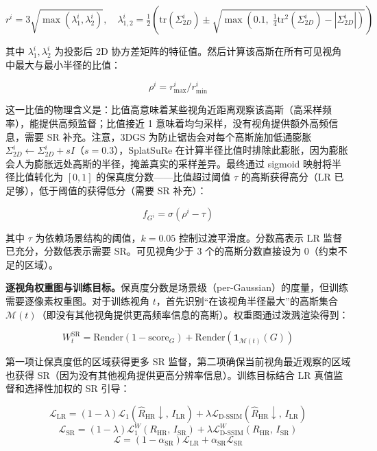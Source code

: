 \begin{equation}
r^i = 3\sqrt{\max(\lambda^i_1, \lambda^i_2)}, \quad \lambda^i_{1,2} = \tfrac{1}{2}\!\left(\text{tr}(\Sigma^i_{2D}) \pm \sqrt{\max\!\left(0.1,\;\tfrac{1}{4}\text{tr}^2(\Sigma^i_{2D}) - |\Sigma^i_{2D}|\right)}\right)
\end{equation}

其中 $\lambda^i_1, \lambda^i_2$ 为投影后 2D 协方差矩阵的特征值。然后计算该高斯在所有可见视角中最大与最小半径的比值：

\begin{equation}
\rho^i = r^i_{\max} / r^i_{\min}
\end{equation}

这一比值的物理含义是：比值高意味着某些视角近距离观察该高斯（高采样频率），能提供高频监督；比值接近 1 意味着均匀采样，没有视角提供额外高频信息，需要 SR 补充。注意，3DGS 为防止锯齿会对每个高斯施加低通膨胀 $\Sigma^i_{2D} \leftarrow \Sigma^i_{2D} + sI$（$s=0.3$），SplatSuRe 在计算半径比值时排除此膨胀，因为膨胀会人为膨胀远处高斯的半径，掩盖真实的采样差异。最终通过 sigmoid 映射将半径比值转化为 $[0,1]$ 的保真度分数——比值超过阈值 $\tau$ 的高斯获得高分（LR 已足够），低于阈值的获得低分（需要 SR 补充）：

\begin{equation}
f_{G^i} = \sigma(\rho^i - \tau)
\end{equation}

其中 $\tau$ 为依赖场景结构的阈值，$k=0.05$ 控制过渡平滑度。分数高表示 LR 监督已充分，分数低表示需要 SR。可见视角少于 3 个的高斯分数直接设为 0（约束不足的区域）。

\textbf{逐视角权重图与训练目标。}保真度分数是场景级（per-Gaussian）的度量，但训练需要逐像素权重图。对于训练视角 $t$，首先识别“在该视角半径最大”的高斯集合 $\mathcal{M}(t)$（即没有其他视角提供更高频率信息的高斯）。权重图通过泼溅渲染得到：

\begin{equation}
W^{\text{SR}}_t = \text{Render}(1 - \text{score}_G) + \text{Render}(\mathbf{1}_{\mathcal{M}(t)}(G))
\end{equation}

第一项让保真度低的区域获得更多 SR 监督，第二项确保当前视角最近观察的区域也获得 SR（因为没有其他视角提供更高分辨率信息）。训练目标结合 LR 真值监督和选择性加权的 SR 引导：

\begin{equation}
\mathcal{L}_{\text{LR}} = (1-\lambda)\mathcal{L}_1(\hat{R}_{\text{HR}}\!\downarrow,\, I_{\text{LR}}) + \lambda \mathcal{L}_{\text{D-SSIM}}(\hat{R}_{\text{HR}}\!\downarrow,\, I_{\text{LR}})
\end{equation}
\begin{equation}
\mathcal{L}_{\text{SR}} = (1-\lambda)\mathcal{L}_1^W(R_{\text{HR}},\, I_{\text{SR}}) + \lambda \mathcal{L}_{\text{D-SSIM}}^W(R_{\text{HR}},\, I_{\text{SR}})
\end{equation}
\begin{equation}
\mathcal{L} = (1-\alpha_{\text{SR}})\mathcal{L}_{\text{LR}} + \alpha_{\text{SR}}\mathcal{L}_{\text{SR}}
\end{equation}

